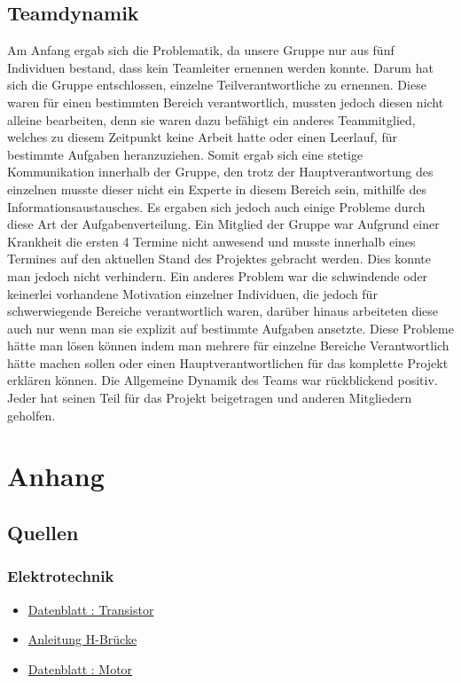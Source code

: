 \documentclass[notitlepage]{report}
\begin{document}
\section{Teamdynamik}

Am Anfang ergab sich die Problematik, da unsere Gruppe nur aus f\"{u}nf Individuen bestand, dass kein Teamleiter ernennen werden  konnte. Darum hat sich die Gruppe entschlossen, einzelne Teilverantwortliche zu ernennen. Diese waren f\"{u}r einen bestimmten Bereich verantwortlich, mussten jedoch diesen nicht alleine bearbeiten, denn sie waren dazu bef\"{a}higt ein anderes Teammitglied, welches zu diesem Zeitpunkt keine Arbeit hatte oder einen Leerlauf, f\"{u}r bestimmte Aufgaben heranzuziehen.
Somit ergab sich eine stetige Kommunikation innerhalb der Gruppe, den trotz der Hauptverantwortung des einzelnen musste dieser nicht ein Experte in diesem Bereich sein, mithilfe des Informationsaustausches.
Es ergaben sich jedoch auch einige Probleme durch diese Art der Aufgabenverteilung. Ein Mitglied der Gruppe war Aufgrund einer Krankheit die ersten 4 Termine nicht anwesend und musste innerhalb eines Termines auf den aktuellen Stand des Projektes gebracht werden. Dies konnte man jedoch nicht verhindern. Ein anderes Problem war die schwindende oder keinerlei vorhandene Motivation einzelner Individuen, die jedoch f\"{u}r schwerwiegende Bereiche verantwortlich waren, dar\"{u}ber hinaus arbeiteten diese auch nur wenn man sie explizit auf bestimmte Aufgaben ansetzte. 
Diese Probleme h\"{a}tte man l\"{o}sen k\"{o}nnen indem man mehrere f\"{u}r einzelne Bereiche Verantwortlich h\"{a}tte machen sollen oder einen Hauptverantwortlichen f\"{u}r das komplette Projekt erkl\"{a}ren k\"{o}nnen.
Die Allgemeine Dynamik des Teams war r\"{u}ckblickend positiv. Jeder hat seinen Teil f\"{u}r das Projekt beigetragen und anderen Mitgliedern geholfen.


\chapter{Anhang}


\section{Quellen}

\subsection{Elektrotechnik}
\begin{itemize}

\item \href{http://cdn-reichelt.de/documents/datenblatt/A100/BC546_48-CDIL.pdf}{Datenblatt : Transistor}


\item \href{http://anleitung.joy-it.net/wp-content/uploads/2017/06/SBC-MotoDriver2-Anleitung.pdf}{Anleitung H-Br\"{u}cke}

\item \href{http://cdn-reichelt.de/documents/datenblatt/A300/COM_MOTOR_RAD_DB-DE.pdf}{Datenblatt : Motor}

\end{itemize}
\end{document}
